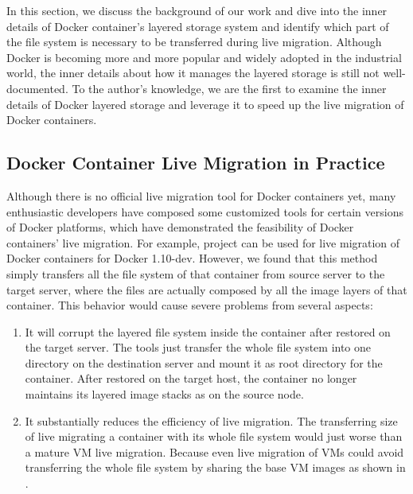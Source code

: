 
In this section, we discuss the background of our work and dive into the inner details of Docker container's layered storage system and identify which part of the file system is necessary to be transferred during live migration. 
Although Docker is becoming more and more popular and widely adopted in the industrial world, the inner details about how it manages the layered storage is still not well-documented. 
To the author's knowledge, we are the first to examine the inner details of Docker layered storage and leverage it to speed up the live migration of Docker containers.






\subsection{Docker Container Live Migration in Practice }\label{migpractice}

Although there is no official live migration tool for Docker containers yet, many enthusiastic developers have composed some customized tools for certain versions of Docker platforms, which have demonstrated the feasibility of Docker containers' live migration. For example, project \cite{boucherPhaul} 
can be used for live migration of Docker containers for Docker 1.10-dev. However, we found that this method simply transfers all the file system of that container from source server to the target server, where the files are actually composed by all the image layers of that container. 
This behavior would cause severe problems from several aspects:
\begin{enumerate}[series = tobecont]
    \item It will corrupt the layered file system inside the container after restored  on the target server. The tools just transfer the whole file system into one directory on the destination server and mount it as root directory for the container. After restored on the target host, the container no longer maintains its layered image stacks as on the source node. 
    \item It substantially reduces the efficiency of live migration. The transferring size of live migrating a container with its whole file system would just worse than a mature VM live migration. Because even live migration of VMs could avoid transferring the whole file system by sharing the base VM images as shown in
    \cite{ha2015vmhandoff}
    . 
\end{enumerate}

